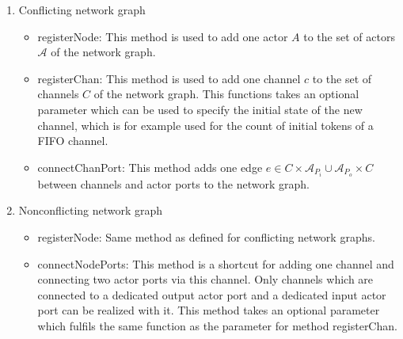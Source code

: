 \begin{enumerate}
\item Conflicting network graph

  \begin{itemize}
  \item registerNode:
    This method is used to add one actor $A$ to the set of actors $\mathcal{A}$
    of the network graph.

  \item registerChan:
    This method is used to add one channel $c$ to the set of channels $C$
    of the network graph. This functions takes an optional parameter which can
    be used to specify the initial state of the new channel, which is
    for example used for the count of initial tokens of a FIFO channel.

  \item connectChanPort:
    This method adds one edge $e \in C \times \mathcal{A}_{P_{i}} \cup \mathcal{A}_{P_{o}} \times C$
    between channels and actor ports to the network graph.


  \end{itemize}

\item Nonconflicting network graph

  \begin{itemize}
  \item registerNode: Same method as defined for conflicting network graphs.
  
  
  \item connectNodePorts:
    This method is a shortcut for adding one channel and
    connecting two actor ports via this channel. Only channels
    which are connected to a dedicated output actor port and
    a dedicated input actor port can be realized with it.
    This method takes an optional parameter which fulfils
    the same function as the parameter for method registerChan.
  
  \end{itemize}

\end{enumerate}

